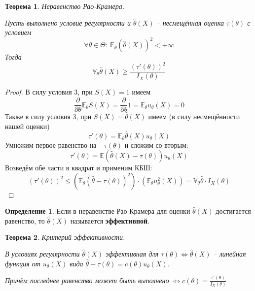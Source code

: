 \documentclass[a4paper,12pt]{article}
\renewcommand{\leq}{\ensuremath{\leqslant}}
\renewcommand{\geq}{\ensuremath{\geqslant}}
\theoremstyle{plain}
\newtheorem{theorem}{Теорема}[section]
\theoremstyle{definition}
\newtheorem{definition}{Определение}[section]
\theoremstyle{remark}
\begin{document}
\begin{theorem}
  Неравенство Рао-Крамера.

  Пусть выполнено условие регулярности и $\hat{\theta}(X)$ -- несмещённая оценка $\tau(\theta)$ с условием 
  \[
    \forall \theta \in \Theta:\:\mathbb{E}_\theta(\hat{\theta}(X))^2 < +\infty
  \]
  Тогда
  \[
    \mathbb{V}_\theta\hat{\theta}(X) \geq \frac{(\tau'(\theta))^2}{I_X(\theta)}
  \]
\end{theorem}

\begin{proof}
  В силу условия 3, при $S(X) = 1$ имеем
  \[
    \frac{\partial}{\partial\theta}\mathbb{E}_\theta S(X) = \frac{\partial}{\partial\theta}1 = \mathbb{E}_\theta u_\theta(X) = 0
  \]
  Также в силу условия 3, при $S(X) = \hat{\theta}(X)$ имеем (в силу несмещённости нашей оценки)
  \[
    \tau'(\theta) = \mathbb{E}_\theta\hat{\theta}(X)u_\theta(X)
  \]
  Умножим первое равенство на $-\tau(\theta)$ и сложим со вторым:
  \[
    \tau'(\theta) = \mathbb{E}(\hat{\theta}(X) - \tau(\theta))u_\theta(X)
  \]
  Возведём обе части в квадрат и применим КБШ:
  \[
    (\tau'(\theta))^2 \leq \left(\mathbb{E}_\theta(\hat{\theta} - \tau(\theta))^2\right)\cdot\left(\mathbb{E}_\theta u_\theta^2(X)\right) = \mathbb{V}_\theta\hat{\theta}\cdot I_X(\theta)
  \]
\end{proof}

\begin{definition}
  Если в неравенстве Рао-Крамера для оценки $\hat{\theta}(X)$ достигается равенство, то $\hat{\theta}(X)$ называется \textbf{эффективной}.
\end{definition}

\begin{theorem}
  Критерий эффективности.

  В условиях регулярности $\hat{\theta}(X)$ эффективная для $\tau(\theta) \Leftrightarrow \hat{\theta}(X)$ -- линейная функция от $u_\theta(X)$ вида $\hat{\theta} - \tau(\theta) = c(\theta)u_\theta(X)$.

  Причём последнее равенство может быть выполнено $\Leftrightarrow c(\theta) = \frac{\tau'(\theta)}{I_X(\theta)}$
\end{theorem}
\end{document}
